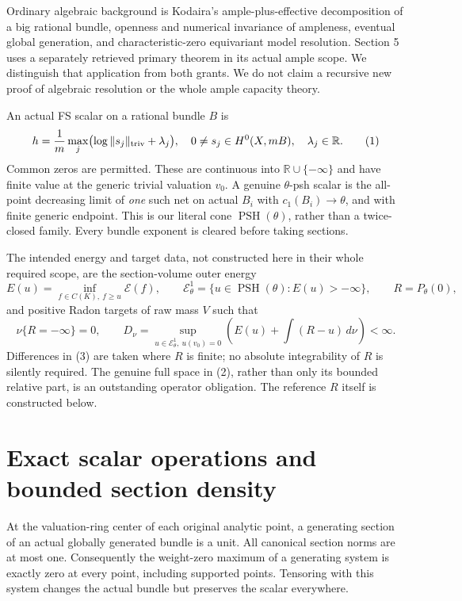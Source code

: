 \documentclass[10pt]{article}
\newcommand{\PSH}{\operatorname{PSH}}
\newcommand{\EE}{\mathcal E^1_\theta}
\begin{document}
Ordinary algebraic background is Kodaira's ample-plus-effective
decomposition of a big rational bundle, openness and numerical invariance
of ampleness, eventual global generation, and characteristic-zero
equivariant model resolution. Section 5 uses a separately retrieved
primary theorem in its actual ample scope. We distinguish that application
from both grants. We do not claim a recursive new proof of algebraic
resolution or the whole ample capacity theory.

An actual FS scalar on a rational bundle $B$ is
\[
 h=\frac1m\max_j\bigl(\log\|s_j\|_{\rm triv}+\lambda_j\bigr),
 \quad 0\ne s_j\in H^0(X,mB),\quad\lambda_j\in\mathbb R.
 \tag{1}
\]
Common zeros are permitted. These are continuous into
$\mathbb R\cup\{-\infty\}$ and have finite value at the generic
trivial valuation $v_0$. A genuine $\theta$-psh scalar is the all-point
decreasing limit of \emph{one} such net on actual $B_i$ with
$c_1(B_i)\to\theta$, and with finite generic endpoint. This is our
literal cone $\PSH(\theta)$, rather than a twice-closed family.
Every bundle exponent is cleared before taking sections.

The intended energy and target data, not constructed here in their
whole required scope, are the section-volume outer energy
\[
 E(u)=\inf_{f\in C(K),\ f\geq u}\mathscr E(f),\qquad
 \EE=\{u\in\PSH(\theta):E(u)>-\infty\},\qquad R=P_\theta(0),
 \tag{2}
\]
and positive Radon targets of raw mass $V$ such that
\[
 \nu\{R=-\infty\}=0,\qquad
 D_\nu=\sup_{u\in\EE,\ u(v_0)=0}
 \left(E(u)+\int(R-u)\,d\nu\right)<\infty.                 \tag{3}
\]
Differences in (3) are taken where $R$ is finite; no absolute
integrability of $R$ is silently required. The genuine full space in
(2), rather than only its bounded relative part, is an outstanding
operator obligation. The reference $R$ itself is constructed below.

\section{Exact scalar operations and bounded section density}
At the valuation-ring center of each original analytic point, a
generating section of an actual globally generated bundle is a unit.
All canonical section norms are at most one. Consequently the
weight-zero maximum of a generating system is exactly zero at every
point, including supported points. Tensoring with this system changes
the actual bundle but preserves the scalar everywhere.
\end{document}
